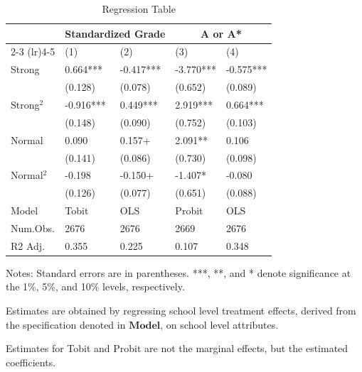 \begin{table}[ht]
\centering
\caption{Regression Table} \label{tab:regression}
\begin{threeparttable}
\begin{tabular}{lllll}
\toprule
\midrule
& \multicolumn{2}{c}{Standardized Grade} & \multicolumn{2}{c}{A or A*} \\
\cmidrule(lr){2-3} \cmidrule(lr){4-5} 
 & (1) & (2) & (3) & (4) \\
\midrule
Strong & 0.664*** & -0.417*** & -3.770*** & -0.575*** \\
       & (0.128)  & (0.078)   & (0.652)   & (0.089)   \\
Strong$^2$ & -0.916*** & 0.449*** & 2.919*** & 0.664*** \\
           & (0.148)    & (0.090)  & (0.752)   & (0.103)   \\
Normal & 0.090    & 0.157+   & 2.091**  & 0.106    \\
       & (0.141)  & (0.086)   & (0.730)   & (0.098)   \\
Normal$^2$ & -0.198   & -0.150+  & -1.407*  & -0.080   \\
           & (0.126)   & (0.077)   & (0.651)   & (0.088)   \\
\midrule
Model   & Tobit    & OLS      & Probit   & OLS      \\
Num.Obs.& 2676     & 2676     & 2669     & 2676     \\
R2 Adj. & 0.355    & 0.225    & 0.107    & 0.348    \\
\bottomrule
\end{tabular}
\begin{tablenotes}
    \footnotesize
    \item[*] Notes: Standard errors are in parentheses. ***, **, and * denote significance at the 1\%, 5\%, and 10\% levels, respectively.
    \item Estimates are obtained  by regressing school level treatment effects, derived from the specification denoted in $\mathbf{Model}$, on school level attributes. 
    \item Estimates for Tobit and Probit are not the marginal effects, but the estimated coefficients.
\end{tablenotes}
\end{threeparttable}
\end{table}
